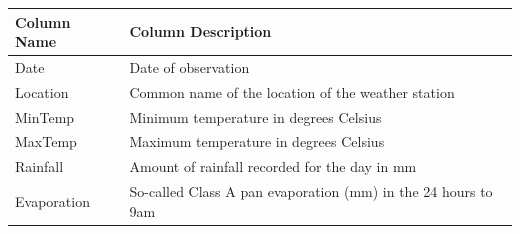 \begin{longtable}[]{@{}ll@{}}
\toprule
\begin{minipage}[b]{0.52\columnwidth}\raggedright
Column Name\strut
\end{minipage} & \begin{minipage}[b]{0.43\columnwidth}\raggedright
Column Description\strut
\end{minipage}\tabularnewline
\midrule
\endhead
\begin{minipage}[t]{0.52\columnwidth}\raggedright
Date\strut
\end{minipage} & \begin{minipage}[t]{0.43\columnwidth}\raggedright
Date of observation\strut
\end{minipage}\tabularnewline
\begin{minipage}[t]{0.52\columnwidth}\raggedright
Location\strut
\end{minipage} & \begin{minipage}[t]{0.43\columnwidth}\raggedright
Common name of the location of the weather station\strut
\end{minipage}\tabularnewline
\begin{minipage}[t]{0.52\columnwidth}\raggedright
MinTemp\strut
\end{minipage} & \begin{minipage}[t]{0.43\columnwidth}\raggedright
Minimum temperature in degrees Celsius\strut
\end{minipage}\tabularnewline
\begin{minipage}[t]{0.52\columnwidth}\raggedright
MaxTemp\strut
\end{minipage} & \begin{minipage}[t]{0.43\columnwidth}\raggedright
Maximum temperature in degrees Celsius\strut
\end{minipage}\tabularnewline
\begin{minipage}[t]{0.52\columnwidth}\raggedright
Rainfall\strut
\end{minipage} & \begin{minipage}[t]{0.43\columnwidth}\raggedright
Amount of rainfall recorded for the day in mm\strut
\end{minipage}\tabularnewline
\begin{minipage}[t]{0.52\columnwidth}\raggedright
Evaporation\strut
\end{minipage} & \begin{minipage}[t]{0.43\columnwidth}\raggedright
So-called Class A pan evaporation (mm) in the 24 hours to 9am\strut
\end{minipage}\tabularnewline

\end{longtable}
